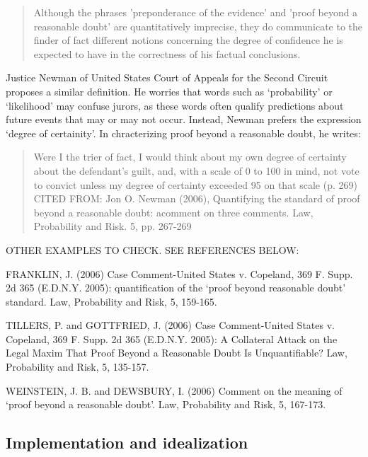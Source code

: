 \documentclass[10pt,dvipsnames,enabledeprecatedfontcommands]{scrartcl}
\begin{document}
\begin{quote}
Although the phrases 'preponderance of the evidence' and 'proof beyond a reasonable doubt' are quantitatively imprecise, they do communicate to the finder of fact different notions concerning the degree of confidence he is expected to have in the correctness of his factual conclusions.
\end{quote}

\noindent
Justice Newman of United States Court of Appeals for the Second Circuit
proposes a similar definition. He worries that words such as
`probability' or `likelihood' may confuse jurors, as these words often
qualify predictions about future events that may or may not occur.
Instead, Newman prefers the expression `degree of certainity'. In
chracterizing proof beyond a reasonable doubt, he writes:

\begin{quote}
Were I the trier of fact, I would think about my own degree of certainty about the defendant's guilt, 
and, with a scale of 0 to 100 in mind, not vote to convict unless my degree of certainty 
exceeded 95 on that scale (p. 269) CITED FROM: Jon O. Newman (2006), Quantifying the standard of proof beyond a reasonable doubt: acomment on three comments. Law, Probability and Risk. 5, pp. 267-269
\end{quote}


OTHER EXAMPLES TO CHECK. SEE REFERENCES BELOW:

FRANKLIN, J. (2006) Case Comment-United States v. Copeland, 369 F. Supp.
2d 365 (E.D.N.Y. 2005): quantification of the `proof beyond reasonable
doubt' standard. Law, Probability and Risk, 5, 159-165.

TILLERS, P. and GOTTFRIED, J. (2006) Case Comment-United States v.
Copeland, 369 F. Supp. 2d 365 (E.D.N.Y. 2005): A Collateral Attack on
the Legal Maxim That Proof Beyond a Reasonable Doubt Is Unquantifiable?
Law, Probability and Risk, 5, 135-157.

WEINSTEIN, J. B. and DEWSBURY, I. (2006) Comment on the meaning of
`proof beyond a reasonable doubt'. Law, Probability and Risk, 5,
167-173.

\subsection{Implementation and
idealization}\label{implementation-and-idealization}
\end{document}
